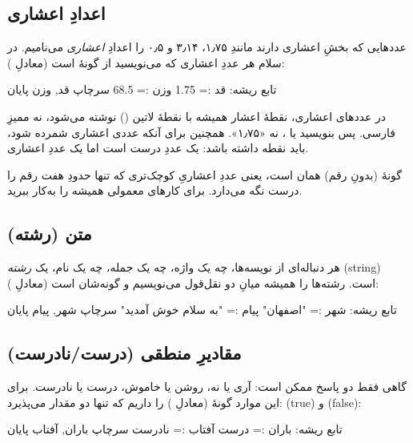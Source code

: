 \subsection{اعدادِ اعشاری}

عددهایی که بخشِ اعشاری دارند مانندِ ۱٫۷۵، ۳٫۱۴ و ۰٫۵ را اعدادِ
\emph{اعشاری} می‌نامیم. در سلام هر عددِ اعشاری که می‌نویسید از گونهٔ
 است (معادلِ ):

\begin{salamfa}
تابع ریشه:
    قد := 1.75
    وزن := 68.5
    سرچاپ قد, وزن
پایان
\end{salamfa}

\begin{warn}
در عددهای اعشاری، نقطهٔ اعشار همیشه با نقطهٔ لاتین () نوشته می‌شود، نه
ممیزِ فارسی. پس بنویسید  یا ، نه «۱٫۷۵». همچنین برای آنکه
عددی اعشاری شمرده شود، باید نقطه داشته باشد:  یک عددِ درست است اما
 یک عددِ اعشاری.
\end{warn}

\begin{note}
گونهٔ  (بدونِ رقم) همان  است، یعنی عددِ اعشاریِ
کوچک‌تری که تنها حدودِ هفت رقم را درست نگه می‌دارد. برای کارهای معمولی همیشه
 را به‌کار ببرید.
\end{note}

\subsection{متن (رشته)}

هر دنباله‌ای از نویسه‌ها، چه یک واژه، چه یک جمله، چه یک نام، یک
\emph{رشته} (string) است. رشته‌ها را همیشه میانِ دو نقل‌قول می‌نویسیم و گونه‌شان
 است (معادلِ ):

\begin{salamfa}
تابع ریشه:
    شهر := "اصفهان"
    پیام := "به سلام خوش آمدید"
    سرچاپ شهر, پیام
پایان
\end{salamfa}

\subsection{مقادیرِ منطقی (درست/نادرست)}

گاهی فقط دو پاسخ ممکن است: آری یا نه، روشن یا خاموش، درست یا نادرست. برای این
موارد گونهٔ  (معادلِ ) را داریم که تنها دو مقدار می‌پذیرد:
 (true) و  (false):

\begin{salamfa}
تابع ریشه:
    باران := درست
    آفتاب := نادرست
    سرچاپ باران, آفتاب
پایان
\end{salamfa}


